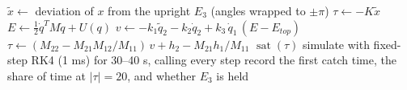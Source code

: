 \begin{algorithm}[H]
\caption{Hybrid swing-up controller (\texttt{Acrobot\_Phase4\_Controller.m}) and tests (\texttt{Acrobot\_Phase4\_Main.m})}
\label{alg:p4}
\begin{algorithmic}[1]
  \State $\tilde x\gets$ deviation of $x$ from the upright $E_3$ (angles wrapped to $\pm\pi$)
    \State $\tau\gets-K\tilde x$ 
  \Else {}
    \State $E\gets\frac12\dot q^TM\dot q+U(q)$
    \State $v\gets-k_1\tilde q_2-k_2\dot q_2+k_3\,\dot q_1\,(E-E_{top})$
    \State $\tau\gets(M_{22}-M_{21}M_{12}/M_{11})\,v+h_2-M_{21}h_1/M_{11}$ 
  \EndIf
  \State \Return $\operatorname{sat}(\tau)$ 
\EndFunction
{}
  \State simulate with fixed-step RK4 (1 ms) for 30--40 s, calling  every step
  \State record the first catch time, the share of time at $|\tau|=20$, and whether $E_3$ is held
\EndFor
\end{algorithmic}
\end{algorithm}
